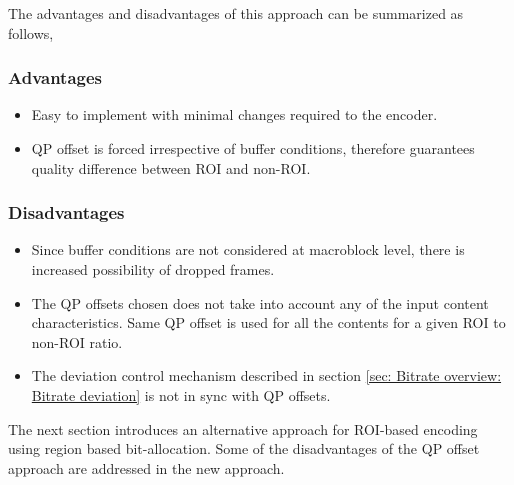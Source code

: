 \documentclass[11pt]{article} %
\begin{document}
The advantages and disadvantages of this approach can be summarized as follows,
\subsubsection*{Advantages}
\begin{itemize}
	\item Easy to implement with minimal changes required to the encoder.
	\item QP offset is forced irrespective of buffer conditions, therefore guarantees quality difference between ROI and non-ROI.
\end{itemize}

\subsubsection*{Disadvantages}
\begin{itemize}
	\item Since buffer conditions are not considered at macroblock level, there is increased possibility of dropped frames.
	\item The QP offsets chosen does not take into account any of the input content characteristics. Same QP offset is used for all the contents for a given ROI to non-ROI ratio.
	\item The deviation control mechanism described in section \ref{sec: Bitrate overview: Bitrate deviation} is not in sync with QP offsets. 
\end{itemize}

The next section introduces an alternative approach for ROI-based encoding using region based bit-allocation. Some of the disadvantages of the QP offset approach are addressed in the new approach.

\end{document}
